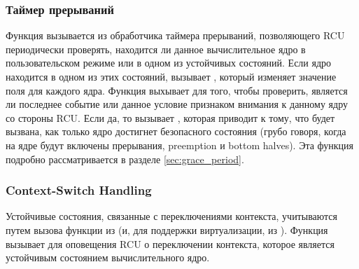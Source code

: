 \subsubsection{Таймер прерываний} \label{sec:timer_interrupt}
Функция  вызывается из обработчика таймера прерываний,
позволяющего RCU периодически проверять, находится ли данное вычислительное
ядро в пользовательском режиме или в одном из устойчивых состояний.
Если ядро находится в одном из этих состояний,
 вызывает ,
который изменяет значение поля  для
каждого ядра.
%
Функция  выхывает 
для того, чтобы проверить, является ли последнее событие или данное условие
признаком внимания к данному ядру со стороны RCU.
Если да, то  вызывает ,
которая приводит к тому, что  будет вызвана,
как только ядро достигнет безопасного состояния
(грубо говоря, когда на ядре будут включены прерывания,
preemption и bottom halves).
Эта функция подробно рассматривается в разделе \ref{sec:grace_period}.

\subsubsection{Context-Switch Handling} \label{sec:context_switch}
Устойчивые состояния, связанные с переключениями контекста,
учитываются путем вызова функции  из
 (и, для поддержки виртуализации,
из ).
%
Функция  вызывает 
для оповещения RCU о переключении контекста, которое является устойчивым
состоянием вычислительного ядро.

